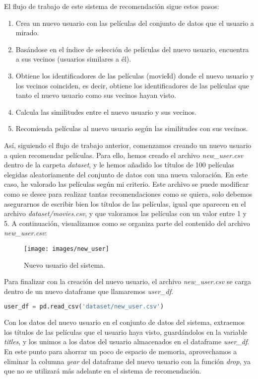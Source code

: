 \documentclass{uimppracticas}
\begin{document}
El flujo de trabajo de este sistema de recomendación sigue estos pasos:

\begin{enumerate}
	\item Crea un nuevo usuario con las películas del conjunto de datos que el usuario a mirado.
	\item Basándose en el índice de selección de películas del nuevo usuario, encuentra a sus vecinos (usuarios similares a él).
	\item Obtiene los identificadores de las películas (movieId) donde el nuevo usuario y los vecinos coinciden, es decir, obtiene los identificadores de las películas que tanto el nuevo usuario como sus vecinos hayan visto.
	\item Calcula las similitudes entre el nuevo usuario y sus vecinos.
	\item Recomienda películas al nuevo usuario según las similitudes con sus vecinos.
\end{enumerate}

Así, siguiendo el flujo de trabajo anterior, comenzamos creando un nuevo usuario a quien recomendar películas. Para ello, hemos creado el archivo \textit{new\_user.csv} dentro de la carpeta \textit{dataset}, y le hemos añadido los títulos de 100 películas elegidas aleatoriamente del conjunto de datos con una nueva valoración. En este caso, he valorado las películas según mi criterio. Este archivo se puede modificar como se desee para realizar tantas recomendaciones como se quiera, solo debemos asegurarnos de escribir bien los títulos de las películas, igual que aparecen en el archivo \textit{dataset/movies.csv}, y que valoramos las películas con un valor entre 1 y 5. A continuación, visualizamos como se organiza parte del contenido del archivo \textit{new\_user.csv}:

\begin{figure}[H]
	\centering
	\texttt{[image: images/new\_user]}
	\caption{Nuevo usuario del sistema.}
\end{figure}

Para finalizar con la creación del nuevo usuario, el archivo \textit{new\_user.csv} se carga dentro de un nuevo dataframe que llamaremos \textit{user\_df}.

\begin{lstlisting}[language=python, basicstyle=\small]
user_df = pd.read_csv('dataset/new_user.csv')
\end{lstlisting}

Con los datos del nuevo usuario en el conjunto de datos del sistema, extraemos los títulos de las películas que el usuario haya visto, guardándolos en la variable \textit{titles}, y los unimos a los datos del usuario almacenados en el dataframe \textit{user\_df}. En este punto para ahorrar un poco de espacio de memoria, aprovechamos a eliminar la columna \textit{year} del dataframe del nuevo usuario con la función \textit{drop}, ya que no se utilizará más adelante en el sistema de recomendación.
\end{document}
